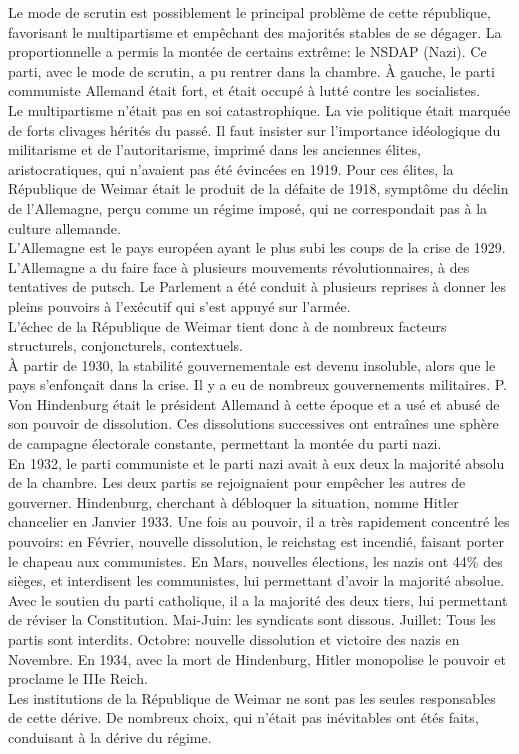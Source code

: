 \documentclass[10pt, a4paper, openany]{book}
\begin{document}
Le mode de scrutin est possiblement le principal problème de cette république, favorisant le multipartisme et empêchant des majorités stables de se dégager. La proportionnelle a permis la montée de certains extrême: le NSDAP (Nazi). Ce parti, avec le mode de scrutin, a pu rentrer dans la chambre. À gauche, le parti communiste Allemand était fort, et était occupé à lutté contre les socialistes. \\
Le multipartisme n'était pas en soi catastrophique. La vie politique était marquée de forts clivages hérités du passé. Il faut insister sur l'importance idéologique du militarisme et de l'autoritarisme, imprimé dans les anciennes élites, aristocratiques, qui n'avaient pas été évincées en 1919. Pour ces élites, la République de Weimar était le produit de la défaite de 1918, symptôme du déclin de l'Allemagne, perçu comme un régime imposé, qui ne correspondait pas à la culture allemande. \\
L'Allemagne est le pays européen ayant le plus subi les coups de la crise de 1929. L'Allemagne a du faire face à plusieurs mouvements révolutionnaires, à des tentatives de putsch. Le Parlement a été conduit à plusieurs reprises à donner les pleins pouvoirs à l'exécutif qui s'est appuyé sur l'armée. \\
L'échec de la République de Weimar tient donc à de nombreux facteurs structurels, conjoncturels, contextuels. \\
À partir de 1930, la stabilité gouvernementale est devenu insoluble, alors que le pays s'enfonçait dans la crise. Il y a eu de nombreux gouvernements militaires. P. Von Hindenburg était le président Allemand à cette époque et a usé et abusé de son pouvoir de dissolution. Ces dissolutions successives ont entraînes une sphère de campagne électorale constante, permettant la montée du parti nazi. \\
En 1932, le parti communiste et le parti nazi avait à eux deux la majorité absolu de la chambre. Les deux partis se rejoignaient pour empêcher les autres de gouverner. Hindenburg, cherchant à débloquer la situation, nomme Hitler chancelier en Janvier 1933. Une fois au pouvoir, il a très rapidement concentré les pouvoirs: en Février, nouvelle dissolution, le reichstag est incendié, faisant porter le chapeau aux communistes. En Mars, nouvelles élections, les nazis ont 44\% des sièges, et interdisent les communistes, lui permettant d'avoir la majorité absolue. Avec le soutien du parti catholique, il a la majorité des deux tiers, lui permettant de réviser la Constitution. Mai-Juin: les syndicats sont dissous. Juillet: Tous les partis sont interdits. Octobre: nouvelle dissolution et victoire des nazis en Novembre. En 1934, avec la mort de Hindenburg, Hitler monopolise le pouvoir et proclame le IIIe Reich. \\
Les institutions de la République de Weimar ne sont pas les seules responsables de cette dérive. De nombreux choix, qui n'était pas inévitables ont étés faits, conduisant à la dérive du régime.
\end{document}
